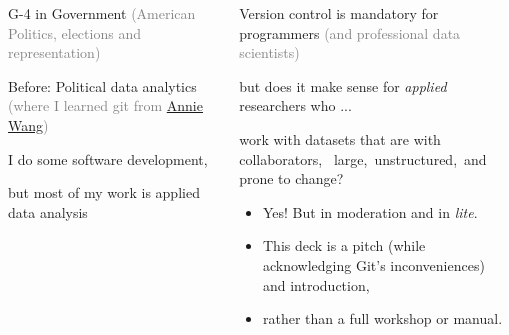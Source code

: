 \documentclass[ignorenonframetext, 10pt, aspectratio=169]{beamer}
\begin{document}
\begin{frame}{}

\begin{columns}[T]

\begin{column}{0.4\textwidth}
\begin{wideitemize}
\item G-4 in Government \textcolor{gray}{(American Politics, elections and representation)}
\item Before: Political data analytics \textcolor{gray}{(where I learned git from \href{https://anniejw.com/}{Annie Wang})}
\end{wideitemize}
\bigskip
\begin{wideitemize}
\item I do some software development,
\item but most of my work is applied data analysis
\end{wideitemize}
\end{column}\pause
\begin{column}{0.6\textwidth}
\begin{wideitemize}
\item Version control is mandatory for programmers \textcolor{gray}{(and professional data scientists)}
\item but does it make sense for \emph{applied} researchers who ...
\item work with datasets that are \alert{with collaborators}, ~\alert{large},\pause ~\alert{unstructured},\pause ~and \alert{prone to change}?
\end{wideitemize}\pause

\medskip
{}

\begin{tcolorbox}
\begin{itemize}
\item[{}] Yes! But in moderation and in \emph{lite}.
\item[{}] This deck is a  pitch (while acknowledging Git's inconveniences) and introduction,
\item[{}] rather than a full workshop or manual.
\end{itemize}
\end{tcolorbox}
\end{column}
\end{columns}
\end{frame}
\end{document}
